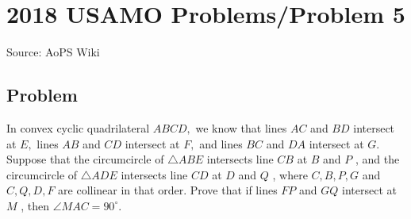 \documentclass[12pt]{article}
\begin{document}
\section*{{2018 USAMO Problems/Problem 5}}
Source: AoPS Wiki

\subsection*{Problem}
In convex cyclic quadrilateral $ABCD,$ we know that lines $AC$ and $BD$ intersect at $E,$ lines $AB$ and $CD$ intersect at $F,$ and lines $BC$ and $DA$ intersect at $G.$ Suppose that the circumcircle of $\triangle ABE$ intersects line $CB$ at $B$ and $P$ , and the circumcircle of $\triangle ADE$ intersects line $CD$ at $D$ and $Q$ , where $C,B,P,G$ and $C,Q,D,F$ are collinear in that order. Prove that if lines $FP$ and $GQ$ intersect at $M$ , then $\angle MAC = 90^{\circ}.$
\end{document}
